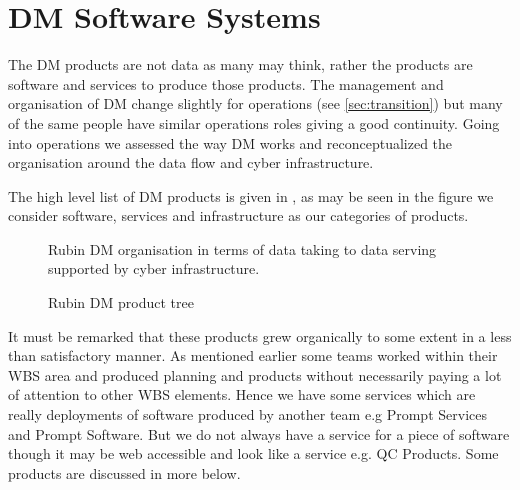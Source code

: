 \section {DM Software Systems} \label{sec:softproducts}
The DM products are not data as many may think, rather the products are software and services to produce those
products.
The management and organisation of DM change slightly for operations (see \autoref{sec:transition}) but many of the same people have similar operations roles
giving a good continuity.
Going into operations we assessed the way DM works and reconceptualized the organisation around the data flow and cyber infrastructure.

The high level list of DM products is given in , as may be seen in the  figure we consider software, services and infrastructure as our categories of products.

\begin{figure}
\caption{Rubin DM  organisation in terms of data taking to data serving supported by cyber infrastructure. \label{fig:dms}}
\end{figure}

\begin{figure}
\caption{Rubin DM product tree \label{fig:pt}}
\end{figure}

It must be remarked that these products grew organically to some extent in a less than satisfactory manner.
As mentioned earlier some teams worked within their WBS area and produced planning and products without necessarily paying a lot of attention to other WBS elements. Hence we have some services which are really deployments of software produced by another team e.g Prompt Services and Prompt Software. But we do not always have a service for a piece of software though it may be web accessible and look like a service e.g. QC Products.
Some products are discussed in more below.








